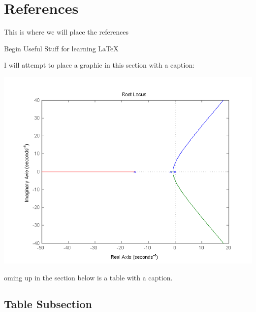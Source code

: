 \documentclass[12pt]{article} %
\begin{document}
\section{References}
This is where we will place the references
\nocite{*}
\begingroup
\renewcommand{\section}[2]{}%


\endgroup


\clearpage
{\Large{\color{red}Begin Useful Stuff for learning LaTeX}}

I will attempt to place a graphic in this section with a caption:
\begin{center}
\includegraphics{rootlocus.png}
\end{center}

\clearpage

\section{Tables}

Coming up in the section below is a table with a caption.

\subsection{Table Subsection}
\end{document}
